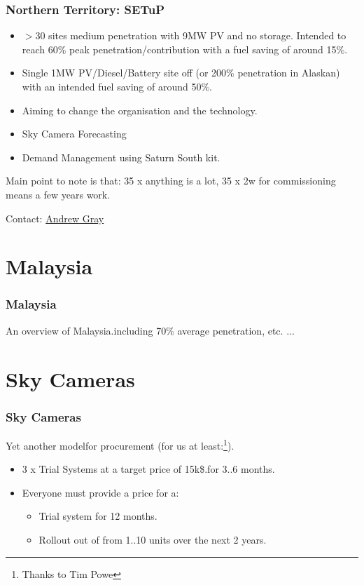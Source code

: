 \documentclass[a4paper,handout]{beamer}
\begin{document}
\begin{frame}\frametitle{Northern Territory: SETuP} 
  \begin{itemize}
  \item $>$30 sites medium penetration with 9MW PV and no storage.
    \pause
    Intended to reach 60\% peak penetration/contribution with a fuel
    saving of around 15\%.
  \item Single 1MW PV/Diesel/Battery site off (or 200\%
    penetration in Alaskan) with an intended fuel saving of around 50\%.
  \item Aiming to change the organisation and the technology.
  \end{itemize}
  \pause
  \begin{itemize}
  \item Sky Camera Forecasting
  \item Demand Management using Saturn South kit.
  \end{itemize}
  \pause
  Main point to note is that: 35 x anything is a lot, 35 x 2w for
  commissioning means a few years work.

  Contact: \href{mailto:andrew.gray@powerwater.com.au}{Andrew Gray}
\end{frame}

\section{Malaysia}
\begin{frame}\frametitle{Malaysia}
An overview of Malaysia.including 70\% average penetration, etc. ...
\end{frame}

\section{Sky Cameras}

\begin{frame}\frametitle{Sky Cameras}
Yet another modelfor procurement (for us at least:\footnote{Thanks to
  Tim Powe}).
  \begin{itemize}
  \item 3 x Trial Systems at a target price of 15k\$.for 3..6 months.
    \pause
  \item Everyone must provide a price for a:
    \begin{itemize}
    \item Trial system for 12 months.
    \item Rollout out of from 1..10 units over the next 2 years.
    \end{itemize}
  \end{itemize}
\end{frame}
\end{document}
